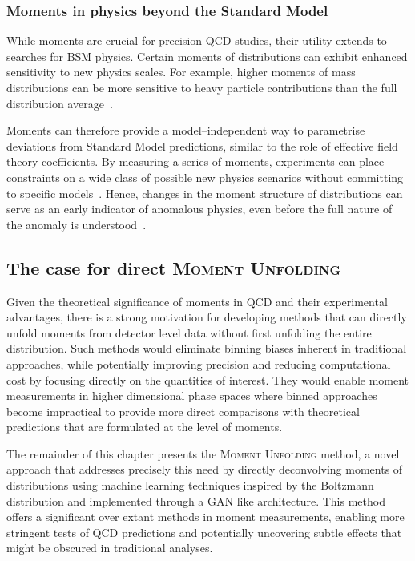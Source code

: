         \subsubsection{Moments in physics beyond the Standard Model}
            While moments are crucial for precision QCD studies, their utility extends to searches for BSM physics.
            Certain moments of distributions can exhibit enhanced sensitivity to new physics scales.
            For example, higher moments of mass distributions can be more sensitive to heavy particle contributions than the full distribution average~\cite{Buterus2023SomeDistributions, cowan_statistical_1998}.
    
            Moments can therefore provide a model--independent way to parametrise deviations from Standard Model predictions, similar to the role of effective field theory coefficients.
            By measuring a series of moments, experiments can place constraints on a wide class of possible new physics scenarios without committing to specific models~\cite{Li2022MomentsPhysics, Larkoski2020JetLearning}.
            Hence, changes in the moment structure of distributions can serve as an early indicator of anomalous physics, even before the full nature of the anomaly is understood~\cite{Li2022MomentsPhysics, Metodiev2024AnomalyObservables, Romao2021FindingColliders}.

    \subsection{The case for direct \textsc{Moment Unfolding}}
        Given the theoretical significance of moments in QCD and their experimental advantages, there is a strong motivation for developing methods that can directly unfold moments from detector level data without first unfolding the entire distribution.
        Such methods would eliminate binning biases inherent in traditional approaches, while potentially improving precision and reducing computational cost by focusing directly on the quantities of interest.
        They would enable moment measurements in higher dimensional phase spaces where binned approaches become impractical to provide more direct comparisons with theoretical predictions that are formulated at the level of moments.

        The remainder of this chapter presents the \textsc{Moment Unfolding} method, a novel approach that addresses precisely this need by directly deconvolving moments of distributions using machine learning techniques inspired by the Boltzmann distribution and implemented through a GAN like architecture.
        This method offers a significant over extant methods in moment measurements, enabling more stringent tests of QCD predictions and potentially uncovering subtle effects that might be obscured in traditional analyses.
